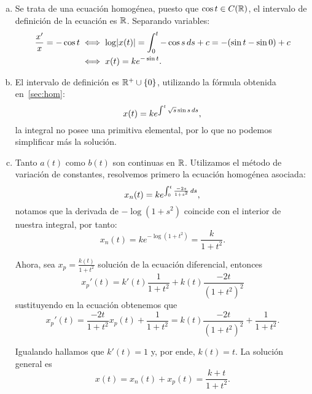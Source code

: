 \documentclass[../ecuaciones_diferenciales.tex]{subfiles}
\begin{document}
\begin{solution}
	\begin{enumerate}[a), wide, labelwidth=0pt, labelindent=0pt]
		\item Se trata de una ecuación homogénea, puesto que
		      \(\cos t \in C(\mathbb{R})\), el intervalo de definición de la ecuación es
		      \(\mathbb{R}\). Separando variables:
		      \begin{align*}
			      \frac{x'}{x} = -\cos t & \iff
			      \log\abs{x(t)} = \int_0^t -\cos s \dif s + c
			      = -(\sin t - \sin 0) + c                            \\
			                             & \iff x(t) = k e^{-\sin t}.
		      \end{align*}

		\item El intervalo de definición es \(\R^+ \cup \set{0}\), utilizando la
		      fórmula obtenida en~\ref{sec:hom}:
		      \[x(t) = k e^{\int^t \sqrt{s} \sin s \mathop{d\!} s},\]
		      la integral no posee una primitiva elemental, por lo que no podemos
		      simplificar más la solución.

		\item Tanto \(a(t)\) como \(b(t)\) son continuas en \(\mathbb{R}\). Utilizamos
		      el método de variación de constantes, resolvemos primero la ecuación
		      homogénea asociada:
		      \[x_n(t) = k e^{\int_0^t \frac{-2s}{1 + s^2} \mathop{d\!} s},\]
		      notamos que la derivada de \(-\log(1 + s^2)\) coincide con el
		      interior de nuestra integral, por tanto:
		      \[x_n(t) = k e^{-\log(1 + t^2)} = \frac{k}{1 + t^2}.\]

		      Ahora, sea \(x_p = \frac{k(t)}{1 + t^2}\) solución de la ecuación
		      diferencial, entonces
		      \[x_p'(t) = k'(t)\frac{1}{1 + t^2} + k(t)\frac{-2t}{(1 + t^2)^2}\]
		      sustituyendo en la ecuación obtenemos que
		      \[x_p'(t) = \frac{-2t}{1 + t^2} x_p(t) + \frac{1}{1 + t^2}
			      = k(t)\frac{-2t}{(1 + t^2)^2}  + \frac{1}{1 + t^2}.\]

		      Igualando hallamos que \(k'(t) = 1\) y, por ende, \(k(t) = t\).
		      La solución general es
		      \[x(t) = x_n(t) + x_p(t) = \frac{k + t}{1 + t^2}.\]


\end{enumerate}
\end{solution}
\end{document}
